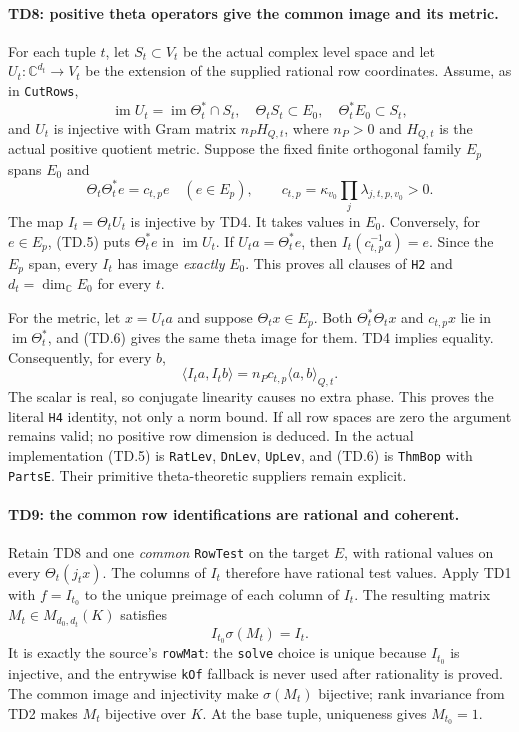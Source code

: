 \paragraph{TD8: positive theta operators give the common image and its metric.}
For each tuple $t$, let $S_t\subset V_t$ be the actual complex level
space and let
$U_t:\mathbb C^{d_t}\to V_t$ be the extension of the supplied rational
row coordinates. Assume, as in \texttt{CutRows},
\[
 \operatorname{im}U_t=\operatorname{im}\Theta_t^*\cap S_t,
 \quad \Theta_t S_t\subset E_0,
 \quad \Theta_t^*E_0\subset S_t,
 \tag{TD.5}
\]
and $U_t$ is injective with Gram matrix $n_P H_{Q,t}$, where $n_P>0$
and $H_{Q,t}$ is the actual positive quotient metric. Suppose the fixed
finite orthogonal family $E_p$ spans $E_0$ and
\[
 \Theta_t\Theta_t^*e=c_{t,p}e\quad(e\in E_p),\qquad
 c_{t,p}=\kappa_{v_0}\prod_j\lambda_{j,t,p,v_0}>0.
 \tag{TD.6}
\]
The map $I_t=\Theta_t U_t$ is injective by TD4. It takes values in
$E_0$. Conversely, for $e\in E_p$, (TD.5) puts $\Theta_t^*e$ in
$\operatorname{im}U_t$. If $U_t a=\Theta_t^*e$, then
$I_t(c_{t,p}^{-1}a)=e$. Since the $E_p$ span, every $I_t$ has image
\emph{exactly} $E_0$. This proves all clauses of \texttt{H2} and
$d_t=\dim_{\mathbb C}E_0$ for every $t$.

For the metric, let $x=U_t a$ and suppose $\Theta_t x\in E_p$.
Both $\Theta_t^*\Theta_t x$ and $c_{t,p}x$ lie in
$\operatorname{im}\Theta_t^*$, and (TD.6) gives the same theta image
for them. TD4 implies equality. Consequently, for every $b$,
\[
 \langle I_t a,I_t b\rangle
   =n_P c_{t,p}\langle a,b\rangle_{Q,t}.
 \tag{TD.7}
\]
The scalar is real, so conjugate linearity causes no extra phase.
This proves the literal \texttt{H4} identity, not only a norm bound.
If all row spaces are zero the argument remains valid; no positive
row dimension is deduced. In the actual implementation (TD.5) is
\texttt{RatLev}, \texttt{DnLev}, \texttt{UpLev}, and (TD.6) is
\texttt{ThmBop} with \texttt{PartsE}. Their primitive theta-theoretic
suppliers remain explicit.

\paragraph{TD9: the common row identifications are rational and coherent.}
Retain TD8 and one \emph{common} \texttt{RowTest} on the target $E$,
with rational values on every $\Theta_t(j_t x)$. The columns of $I_t$
therefore have rational test values. Apply TD1 with $f=I_{t_0}$ to the
unique preimage of each column of $I_t$. The resulting matrix
$M_t\in M_{d_0,d_t}(K)$ satisfies
\[
 I_{t_0}\sigma(M_t)=I_t. \tag{TD.8}
\]
It is exactly the source's \texttt{rowMat}: the \texttt{solve} choice
is unique because $I_{t_0}$ is injective, and the entrywise
\texttt{kOf} fallback is never used after rationality is proved.
The common image and injectivity make $\sigma(M_t)$ bijective;
rank invariance from TD2 makes $M_t$ bijective over $K$.
At the base tuple, uniqueness gives $M_{t_0}=1$.

